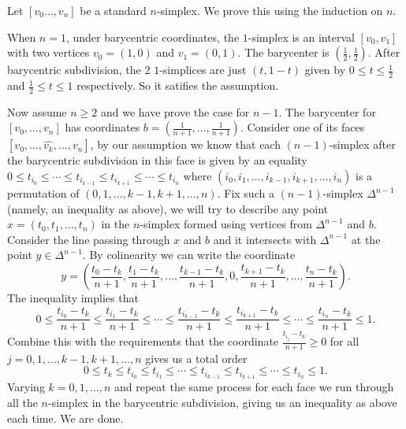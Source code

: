 \documentclass[a4paper, 12pt]{article}
\begin{document}
\begin{solution}
Let \([v_0\ldots,v_n]\) be a standard \(n\)-simplex. We prove this using the induction on \(n\). 
\par 
When \(n=1\), under barycentric coordinates, the \(1\)-simplex is an interval \([v_0,v_1]\) with two vertices \(v_0=(1,0)\) and \(v_1=(0,1)\). The barycenter is \((\frac{1}{2},\frac{1}{2})\). After barycentric 
subdivision, the 2 \(1\)-simplices are just \((t,1-t)\) given by \(0\leq t\leq \frac{1}{2}\) and \(\frac{1}{2}\leq t\leq 1\) respectively. So it satifies the assumption. 
\par 
Now assume \(n\geq 2\) and we have prove the case for \(n-1\). The barycenter for \([v_0,\ldots,v_n]\) has coordinates \(b=(\frac{1}{n+1},\ldots,\frac{1}{n+1})\). Consider one of its faces \([v_0,\ldots,\hat{v_k},\ldots,v_n]\), by our assumption we know that 
each \((n-1)\)-simplex after the barycentric subdivision in this face is given by an equality \(0\leq t_{i_0}\leq \cdots\leq t_{i_{k-1}}\leq t_{i_{k+1}}\leq \cdots\leq t_{i_n}\) where \((i_0,i_1,\ldots,i_{k-1},i_{k+1},\ldots,i_n )\) is a permutation of \((0,1,\ldots,k-1,k+1,\ldots,n)\). Fix such a 
\((n-1)\)-simplex \(\Delta^{n-1}\) (namely, an inequality as above), we will try to describe any point \(x=(t_0,t_1,\ldots,t_n)\) in the \(n\)-simplex formed using vertices from \(\Delta^{n-1}\) and \(b\). Consider the line passing through \(x\) and \(b\) and it intersects with \(\Delta^{n-1}\) at the point \(y\in \Delta^{n-1}\). 
By colinearity we can write the coordinate 
\[y=(\frac{t_0-t_k}{n+1},\frac{t_1-t_k}{n+1},\ldots,\frac{t_{k-1}-t_k}{n+1},0,\frac{t_{k+1}-t_k}{n+1},\ldots,\frac{t_n-t_k}{n+1}).\]
The inequality implies that 
\[0\leq \frac{t_{i_0}-t_k}{n+1}\leq \frac{t_{i_1}-t_k}{n+1}\leq\cdots \leq\frac{t_{i_{k-1}}-t_k}{n+1}\leq \frac{t_{i_{k+1}}-t_k}{n+1}\leq \cdots\leq \frac{t_{i_n}-t_k}{n+1}\leq 1.\]
Combine this with the requirements that the coordinate \(\frac{t_{i_j}-t_k}{n+1}\geq 0\) for all \(j=0,1,\ldots,k-1,k+1,\ldots,n\) gives us a total order
\[0\leq t_k\leq t_{i_0}\leq t_{i_1}\leq \cdots\leq t_{i_{k-1}}\leq t_{i_{k+1}}\leq \cdots\leq t_{i_n}\leq 1.\]
Varying \(k=0,1,\ldots,n\) and repeat the same process for each face we run through all the \(n\)-simplex in the barycentric subdivision, giving us an inequality as above each time. We are done. 
\end{solution}
\end{document}
